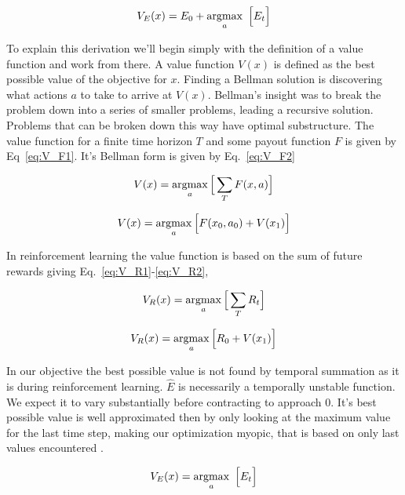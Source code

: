 \begin{equation}
	\label{eq:V_E} 
	V_E(x) = E_0 + \operatorname*{argmax}_a \ \Big [ E_t \Big ] \\
\end{equation}

To explain this derivation we'll begin simply with the definition of a value function and work from there. A value function $V(x)$ is defined as the best possible value of the objective for $x$. Finding a Bellman solution is discovering what actions $a$ to take to arrive at $V(x)$. Bellman's insight was to break the problem down into a series of smaller problems, leading a recursive solution. Problems that can be broken down this way have optimal substructure. The value function for a finite time horizon $T$ and some payout function $F$ is given by Eq~\ref{eq:V_F1}. It's Bellman form is given by Eq.~\ref{eq:V_F2}

\begin{equation}
	\label{eq:V_F1}
	V(x) = \operatorname*{argmax}_a \Big [ \sum_T F(x, a) \Big ]
\end{equation}

\begin{equation}
	\label{eq:V_F2}
	V(x) = \operatorname*{argmax}_a \Big [ F(x_0, a_0) + V(x_1) \Big ]
\end{equation}

In reinforcement learning the value function is based on the sum of future rewards giving Eq.~\ref{eq:V_R1}-\ref{eq:V_R2},

\begin{equation}
	\label{eq:V_R1}
	V_R(x) = \operatorname*{argmax}_a \Big [ \sum_T R_t \Big ]
\end{equation}

\begin{equation}
	\label{eq:V_R2}
	V_R(x) = \operatorname*{argmax}_a \Big [ R_0 + V(x_1) \Big ] \\
\end{equation}

In our objective the best possible value is not found by temporal summation as it is during reinforcement learning. $\hat E$ is necessarily a temporally unstable function. We expect it to vary substantially before contracting to approach 0. It's best possible value is well approximated then by only looking at the maximum value for the last time step, making our optimization myopic, that is based on only last values encountered \citep{Hocker2019}.

\begin{equation}
	\label{eq:V_E1} 
	V_E(x) = \operatorname*{argmax}_a \ \Big [ E_t \Big ]
\end{equation}

